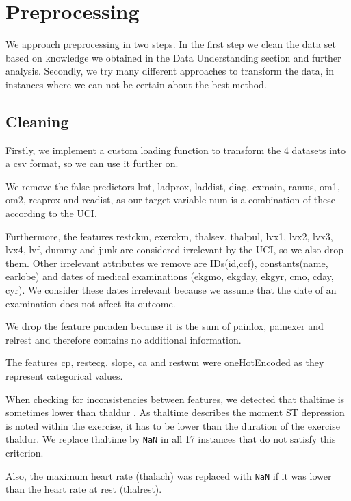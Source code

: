 \newpage
\section{Preprocessing}
We approach preprocessing in two steps. In the first step we clean the data set based on knowledge we obtained in the Data Understanding section and further analysis. 
Secondly, we try many different approaches to transform the data, in instances where we can not be certain about the best method. 

\subsection{Cleaning}
Firstly, we implement a custom loading function to transform the 4 datasets into a csv format, so we can use it further on.

We remove the false predictors lmt, ladprox, laddist, diag, cxmain, ramus, om1, om2, rcaprox and rcadist, as our target variable num is a combination of these according to the UCI. %

Furthermore, the features restckm, exerckm, thalsev, thalpul, lvx1, lvx2, lvx3, lvx4, lvf, dummy and junk are considered irrelevant by the UCI, so we also drop them. Other irrelevant attributes we remove are IDs(id,ccf), constants(name, earlobe) and dates of medical examinations (ekgmo, ekgday, ekgyr, cmo, cday, cyr). We consider these dates irrelevant because we assume that the date of  an examination does not affect its outcome. 

We drop the feature pncaden because it is the sum of painlox, painexer and relrest and therefore contains no additional information. 

The features cp, restecg, slope, ca and restwm were oneHotEncoded as they represent categorical values.

When checking for inconsistencies between features, we detected that thaltime is sometimes lower than thaldur . As thaltime describes the moment  ST depression is noted within the exercise, it has to be lower than the duration of the exercise thaldur. We replace thaltime by \texttt{NaN} in all 17 instances that do not satisfy this criterion. 

Also, the maximum heart rate (thalach) was replaced with \texttt{NaN} if it was lower than the heart rate at rest (thalrest).


